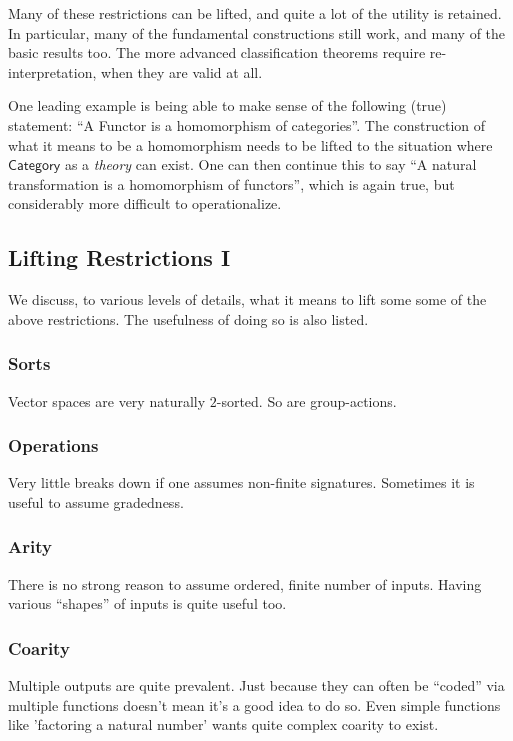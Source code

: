 \documentclass[a4paper,UKenglish,cleveref, autoref, thm-restate]{lipics-v2021}
\begin{document}
Many of these restrictions can be lifted, and quite a lot of the utility
is retained. In particular, many of the fundamental constructions still work,
and many of the basic results too. The more advanced classification theorems
require re-interpretation, when they are valid at all.

One leading example is being able to make sense of the following (true)
statement: ``A Functor is a homomorphism of categories''. The construction
of what it means to be a homomorphism needs to be lifted to the situation
where $\mathsf{Category}$ as a \emph{theory} can exist. One can then
continue this to say ``A natural transformation is a homomorphism of 
functors'', which is again true, but considerably more difficult to
operationalize.

\subsection{Lifting Restrictions I}

We discuss, to various levels of details, what it means to lift some
some of the above restrictions. The usefulness of doing so is also listed.

\subsubsection{Sorts}
Vector spaces are very naturally $2$-sorted. So are group-actions.

\subsubsection{Operations}
Very little breaks down if one assumes non-finite signatures. Sometimes it
is useful to assume gradedness.

\subsubsection{Arity}
There is no strong reason to assume ordered, finite number of inputs.
Having various ``shapes'' of inputs is quite useful too. 

\subsubsection{Coarity}
Multiple outputs are quite prevalent. Just because they can often be
``coded'' via multiple functions doesn't mean it's a good idea to do so.
Even simple functions like 'factoring a natural number' wants quite
complex coarity to exist.
\end{document}
